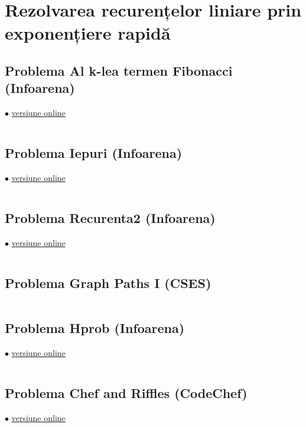 \documentclass[../main.tex]{subfiles}
\begin{document}
\chapter{Rezolvarea recurențelor liniare prin exponențiere rapidă}

\section{Problema Al k-lea termen Fibonacci (Infoarena)}
\label{code:kfib}
$\bullet$
\href{https://www.infoarena.ro/job_detail/3207557?action=view-source}{versiune online}

\inputminted{cpp}{../src/math/kfib.cpp}

\section{Problema Iepuri (Infoarena)}
\label{code:iepuri}
$\bullet$
\href{https://www.infoarena.ro/job_detail/3207573?action=view-source}{versiune online}

\inputminted{cpp}{../src/math/iepuri.cpp}

\section{Problema Recurenta2 (Infoarena)}
\label{code:recurenta2}
$\bullet$
\href{https://www.infoarena.ro/job_detail/3207620?action=view-source}{versiune online}

\inputminted{cpp}{../src/math/recurenta2.cpp}

\section{Problema Graph Paths I (CSES)}
\label{code:graph-paths-1}

\inputminted{cpp}{../src/math/graph-paths-1.cpp}

\section{Problema Hprob (Infoarena)}
\label{code:hprob}
$\bullet$
\href{https://www.infoarena.ro/job_detail/3207760?action=view-source}{versiune online}

\inputminted{cpp}{../src/math/hprob.cpp}

\section{Problema Chef and Riffles (CodeChef)}
\label{code:riffles}
$\bullet$
\href{https://www.codechef.com/viewsolution/1047339191}{versiune online}
\end{document}
